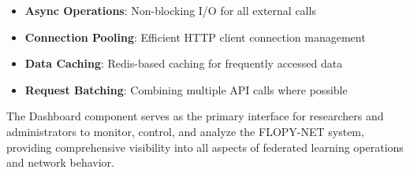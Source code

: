 \begin{itemize}
    \item \textbf{Async Operations}: Non-blocking I/O for all external calls
    \item \textbf{Connection Pooling}: Efficient HTTP client connection management
    \item \textbf{Data Caching}: Redis-based caching for frequently accessed data
    \item \textbf{Request Batching}: Combining multiple API calls where possible
\end{itemize}

The Dashboard component serves as the primary interface for researchers and administrators to monitor, control, and analyze the FLOPY-NET system, providing comprehensive visibility into all aspects of federated learning operations and network behavior.
